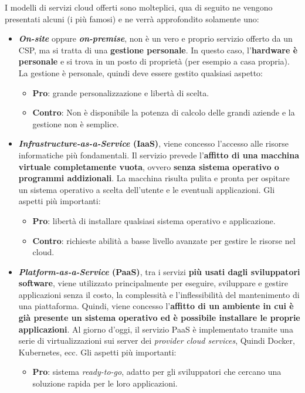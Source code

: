 \documentclass[a4paper]{article}
\begin{document}
	I modelli di servizi cloud offerti sono molteplici, qua di seguito ne vengono presentati alcuni (i più famosi) e ne verrà approfondito solamente uno:
	\begin{itemize}
		\item \textcolor{Red3}{\textbf{\emph{On-site}}} oppure \textcolor{Red3}{\textbf{\emph{on-premise}}}, non è un vero e proprio servizio offerto da un CSP, ma si tratta di una \textbf{gestione personale}. In questo caso, l'\textbf{hardware è personale} e si trova in un posto di proprietà (per esempio a casa propria). La gestione è personale, quindi deve essere gestito qualsiasi aspetto:
		\begin{itemize}
			\item \textbf{Pro}: grande personalizzazione e libertà di scelta.
			\item \textbf{Contro}: Non è disponibile la potenza di calcolo delle grandi aziende e la gestione non è semplice.
		\end{itemize}
		
		\item \textcolor{Red3}{\textbf{\emph{Infrastructure-as-a-Service} (IaaS)}}, viene concesso l'accesso alle risorse informatiche più fondamentali. Il servizio prevede l'\textbf{affitto di una macchina virtuale completamente vuota}, ovvero \textbf{senza sistema operativo o programmi addizionali}. La macchina risulta pulita e pronta per ospitare un sistema operativo a scelta dell'utente e le eventuali applicazioni. Gli aspetti più importanti:
		\begin{itemize}
			\item \textbf{Pro}: libertà di installare qualsiasi sistema operativo e applicazione.
			
			\item \textbf{Contro}: richieste abilità a basse livello avanzate per gestire le risorse nel cloud.
		\end{itemize}
		
		\item \textcolor{Red3}{\textbf{\emph{Platform-as-a-Service} (PaaS)}}, tra i servizi \textbf{più usati dagli sviluppatori software}, viene utilizzato principalmente per eseguire, sviluppare e gestire applicazioni senza il costo, la complessità e l'inflessibilità del mantenimento di una piattaforma. Quindi, viene concesso l'\textbf{affitto di un ambiente in cui è già presente un sistema operativo ed è possibile installare le proprie applicazioni}. Al giorno d'oggi, il servizio PaaS è implementato tramite una serie di virtualizzazioni sui server dei \emph{provider cloud services}, Quindi Docker, Kubernetes, ecc. Gli aspetti più importanti:
		\begin{itemize}
			\item \textbf{Pro}: sistema \emph{ready-to-go}, adatto per gli sviluppatori che cercano una soluzione rapida per le loro applicazioni.
			

\end{itemize}
\end{itemize}
\end{document}
